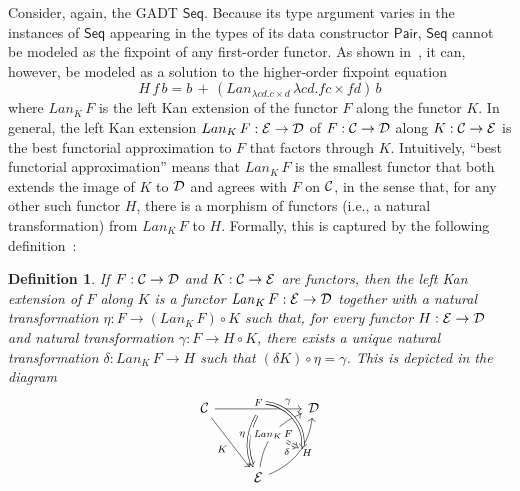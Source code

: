 \documentclass[submission,copyright,creativecommons]{eptcs}
\newtheorem{definition}[thm]{Definition}
\begin{document}
Consider, again, the GADT $\mathsf{Seq}$. Because its type argument
varies in the instances of $\mathsf{Seq}$ appearing in the types of
its data constructor $\mathsf{Pair}$, $\mathsf{Seq}$ cannot be
modeled as the fixpoint of any first-order functor. As shown
in~\cite{jp19}, it can, however, be modeled as a solution to the
higher-order fixpoint equation
\[H\,f\,b = b \,+\,(Lan_{\lambda c d. c \times d}\, \lambda
c d. f c \times f d)\,b\] where $Lan_K \,F$ is the left Kan extension
of the functor $F$ along the functor $K$. In general, the left Kan
extension $Lan_K \,F : {\cal E} \to {\cal D}$ of $F : {\cal C} \to
{\cal D}$ along $K : {\cal C} \to {\cal E}$ is the best functorial
approximation to $F$ that factors through $K$. Intuitively, ``best functorial
approximation'' means that $Lan_K \,F$ is the smallest functor that
both extends the image of $K$ to $\cal D$ and agrees with $F$ on $\cal
C$, in the sense that, for any other such functor $H$, there is a
morphism of functors (i.e., a natural transformation) from $Lan_K \,F$
to $H$. Formally, this is captured by the following
definition~\cite{mac71}:
\begin{definition}\label{def:lke}
If $F : {\cal C} \to {\cal D}$ and $K : {\cal C} \to {\cal E}$ are
functors, then the {\em left Kan extension of $F$ along $K$} is a
functor $\mathit{Lan}_K\,F : {\cal E} \to {\cal D}$ together with a
natural transformation $\eta : F \to (\mathit{Lan}_K\,F) \circ K$ such
that, for every functor $H : {\cal E} \to {\cal D}$ and natural
transformation $\gamma : F \to H \circ K$, there exists a unique
natural transformation $\delta : \mathit{Lan}_K\,F \to H$ such that
$(\delta K) \circ \eta = \gamma$. This is depicted in the diagram
\[\begin{tikzcd}[row sep = huge]
{\cal C}
\ar[rr, "{F}"{name=Fa, above}, ""{name=F, below}]
\ar[rd, "{K}"']
&& {\cal D} \\
& {\cal E}
\ar[Rightarrow, bend right = 25, from=F, "{\eta}"']
\ar[ur, bend left, "{\mathit{Lan}_{K}\,F}"{name=Lan, description}]
\ar[ur, bend right, "{H}"'{name=L, right}, ""'{name=Lr, right}]
\ar[Rightarrow, bend left = 45, from=Fa, to=Lr, "{\gamma}" near start]
\ar[Rightarrow, dashed, from=Lan, to=L, "{\delta}"']
\end{tikzcd}\]
\end{definition}
\end{document}
